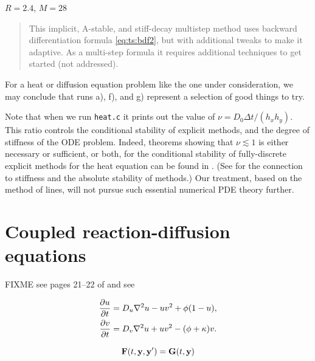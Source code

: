 \begin{enumerate}
\hfill $R=2.4$, $M=28$
\begin{quote} This implicit, A-stable, and stiff-decay multistep method \citep{AscherPetzold1998} uses backward differentiation formula \eqref{eq:ts:bdf2}, but with additional tweaks to make it adaptive.  As a multi-step formula it requires additional techniques to get started (not addressed).\end{quote}
\end{enumerate}

For a heat or diffusion equation problem like the one under consideration, we may conclude that runs a), f), and g) represent a selection of good things to try.

Note that when we run \texttt{heat.c} it prints out the value of $\nu = D_0 \Delta t / (h_x h_y)$.  This ratio controls the conditional stability of explicit methods, and the degree of stiffness of the ODE problem.  Indeed, theorems showing that $\nu \lesssim 1$ is either necessary or sufficient, or both, for the conditional stability of fully-discrete explicit methods for the heat equation can be found in \citep{MortonMayers2005}.  (See \citep{LeVeque2007} for the connection to stiffness and the absolute stability of methods.)  Our treatment, based on the method of lines, will not pursue such essential numerical PDE theory further.



\section{Coupled reaction-diffusion equations}

FIXME see pages 21--22 of \citep{HundsdorferVerwer2003} and see \citep{Pearson1993}

\begin{align}
\frac{\partial u}{\partial t} &= D_u \nabla^2 u - u v^2 + \phi (1 - u), \label{eq:ts:pattern:pde} \\
\frac{\partial v}{\partial t} &= D_v \nabla^2 u + u v^2 - (\phi + \kappa) v. \notag
\end{align}

\begin{equation}
\mathbf{F}(t,\mathbf{y},\mathbf{y}') = \mathbf{G}(t,\mathbf{y}) \label{eq:ts:pattern:imexform}
\end{equation}

